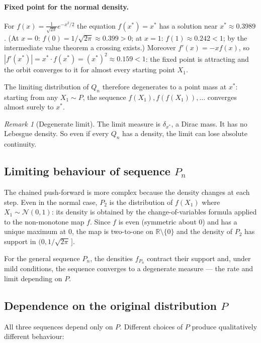 \documentclass[a4paper,oneside,12pt]{extarticle}
\theoremstyle{plain}
\theoremstyle{definition}
\theoremstyle{remark}
\newtheorem{remark}[proposition]{Remark}
\begin{document}
\paragraph{Fixed point for the normal density.}
For $f(x) = \frac{1}{\sqrt{2\pi}}e^{-x^2/2}$ the equation
$f(x^*) = x^*$ has a solution near $x^* \approx 0.3989$.
(At $x=0$: $f(0) = 1/\sqrt{2\pi} \approx 0.399 > 0$; at $x=1$:
$f(1) \approx 0.242 < 1$; by the intermediate value theorem a
crossing exists.)  Moreover $f'(x) = -x f(x)$, so
$|f'(x^*)| = x^* \cdot f(x^*) = (x^*)^2 \approx 0.159 < 1$:
the fixed point is attracting and the orbit converges to it for
almost every starting point $X_1$.

The limiting distribution of $Q_n$ therefore degenerates to a point
mass at $x^*$: starting from any $X_1 \sim P$, the sequence
$f(X_1), f(f(X_1)), \ldots$ converges almost surely to $x^*$.

\begin{remark}[Degenerate limit]
The limit measure is $\delta_{x^*}$, a Dirac mass.  It has no
Lebesgue density.  So even if every $Q_n$ has a density, the limit
can lose absolute continuity.
\end{remark}

\subsection{Limiting behaviour of sequence $P_n$}

The chained push-forward is more complex because the density
changes at each step.  Even in the normal case, $P_2$ is the
distribution of $f(X_1)$ where $X_1 \sim \mathcal{N}(0,1)$: its
density is obtained by the change-of-variables formula applied to
the non-monotone map $f$.  Since $f$ is even (symmetric about 0)
and has a unique maximum at 0, the map is two-to-one on
$\mathbb{R}\setminus\{0\}$ and the density of $P_2$ has support
in $(0, 1/\sqrt{2\pi}\,]$.

For the general sequence $P_n$, the densities $f_{P_n}$ contract
their support and, under mild conditions, the sequence converges
to a degenerate measure --- the rate and limit depending on $P$.

\subsection{Dependence on the original distribution $P$}

All three sequences depend only on $P$.  Different choices of $P$
produce qualitatively different behaviour:
\end{document}
